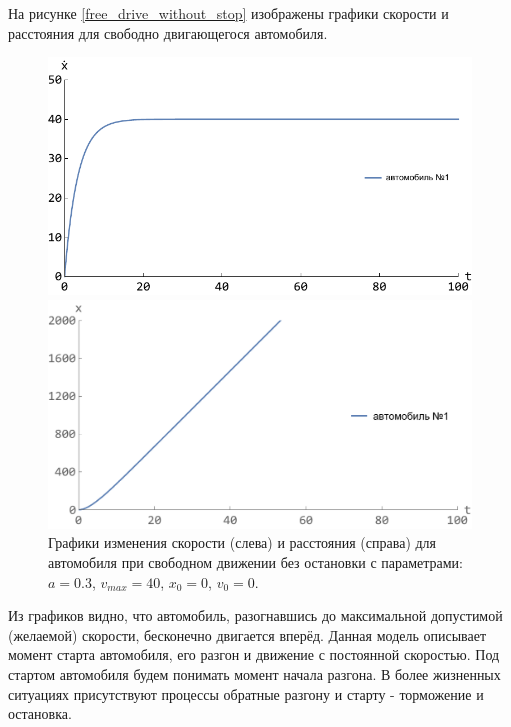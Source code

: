 \documentclass[12pt, a4paper]{extarticle}
\numberwithin{equation}{section}
\numberwithin{figure}{section}
\begin{document}
На рисунке \eqref{free_drive_without_stop} изображены графики скорости и расстояния для свободно двигающегося автомобиля.
\begin{figure}[h!]
	\begin{center}
		\begin{minipage}[h!]{0.48\linewidth}
			\includegraphics[width=1\linewidth,height=0.2\textheight]
			{Images/free_drive_speed.pdf}
		\end{minipage}
		\hfill 
		\begin{minipage}[h!]{0.48\linewidth}
			\includegraphics[width=1\linewidth,height=0.2\textheight]
			{Images/free_drive_distance.pdf}
		\end{minipage}
		\caption{Графики изменения скорости (слева) и расстояния (справа) для автомобиля при свободном движении без остановки с параметрами: $a=0.3$, $v_{max}=40$, $x_0=0$, $v_0=0$.}
		\label{free_drive_without_stop}
	\end{center}
\end{figure}

Из графиков видно, что автомобиль, разогнавшись до максимальной допустимой (желаемой) скорости, бесконечно двигается вперёд. Данная модель описывает момент старта автомобиля, его разгон и движение с постоянной скоростью. Под стартом автомобиля будем понимать момент начала разгона. В более жизненных ситуациях присутствуют процессы обратные разгону и старту - торможение и остановка.
\end{document}
